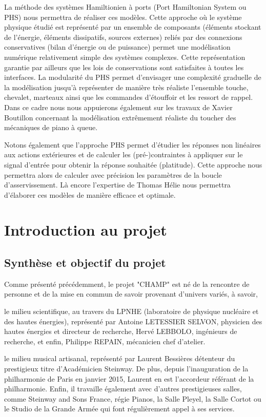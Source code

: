 \documentclass[french,a4paper,12pt]{report}
\begin{document}
La méthode des systèmes Hamiltionien à ports (Port Hamiltonian System ou PHS) nous permettra de réaliser ces modèles. Cette approche où le système physique étudié est représenté par un ensemble de composants (éléments stockant de l’énergie, éléments dissipatifs, sources externes) reliés par des connexions conservatives (bilan d’énergie ou de puissance) permet une modélisation numérique relativement simple des systèmes complexes. Cette représentation garantie par ailleurs que les lois de conservations sont satisfaites à toutes les interfaces. La modularité du PHS permet d’envisager une complexité graduelle de la modélisation jusqu’à représenter de manière très réaliste l’ensemble touche, chevalet, marteaux ainsi que les commandes d’étouffoir et les ressort de rappel. Dans ce cadre nous nous appuierons également sur les travaux de Xavier Boutillon concernant la modélisation extrêmement réaliste du toucher des mécaniques de piano à queue.

Notons également que l’approche PHS permet d’étudier les réponses non linéaires aux actions extérieures et de calculer les (pré-)contraintes à appliquer sur le signal d’entrée pour obtenir la réponse souhaitée (platitude). Cette approche nous permettra alors de calculer avec précision les paramètres de la boucle d’asservissement. Là encore l’expertise de Thomas Hélie nous permettra d’élaborer ces modèles de manière efficace et optimale.

	\chapter{Introduction au projet}
	
	\section{Synthèse et objectif du projet}
	
	Comme présenté précédemment, le projet "CHAMP" est né de la rencontre de personne et de la mise en commun de savoir provenant d'univers variés, à savoir, 
	
	le milieu scientifique, au travers du LPNHE (laboratoire de physique nucléaire et des hautes énergies), représenté par Antoine LETESSIER SELVON, physicien des hautes énergies et directeur de recherche, Hervé LEBBOLO, ingénieurs de recherche, et enfin,  Philippe REPAIN, mécanicien chef d'atelier.
	
	le milieu musical artisanal, représenté par Laurent Bessières détenteur du prestigieux titre d'Académicien Steinway.
	De plus, depuis l'inauguration de la philharmonie de Paris en janvier 2015, Laurent en est l'accordeur référant de la philharmonie. Enfin, il travaille également avec d'autres prestigieuses salles, comme Steinway and Sons France, régie Pianos, la Salle Pleyel, la Salle Cortot ou le Studio de la Grande Armée qui font régulièrement appel à ses services.	
	
\end{document}
